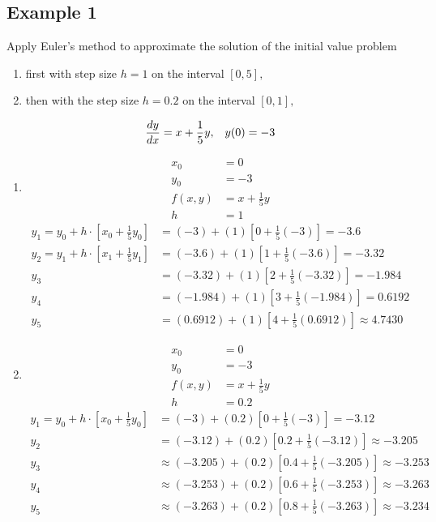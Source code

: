 \documentclass{article}
\begin{document}
\subsection{Example 1} \label{example:1}
Apply Euler's method to approximate the solution of the initial value problem
\begin{enumerate}[label=\textbf{(\alph*)}]
	\item first with step size $ h = 1 $ on the interval $ [0,5], $
	\item then with the step size $ h = 0.2 $ on the interval $ [0,1], $
\end{enumerate}
\begin{equation*}
	\cond{\frac{dy}{dx} = x + \frac{1}{5}y,}{y(0) = -3}
\end{equation*}
\begin{enumerate}[label=\textbf{(\alph*)}]
	\item
		\begin{align*}
			x_0 & = 0 \\
			y_0 & = -3 \\
			f(x,y) & = x + \frac{1}{5}y \\
			h & = 1
		\end{align*}
		\begin{align*}
			y_1 = y_0 + h \cdot \left[ x_0 + \frac{1}{5}y_0 \right] & = (-3) + (1) \left[ 0 + \frac{1}{5}(-3) \right] = -3.6 \\
			y_2 = y_1 + h \cdot \left[ x_1 + \frac{1}{5}y_1 \right] & = (-3.6) + (1) \left[ 1 + \frac{1}{5}(-3.6) \right] = -3.32 \\
			y_3 & = (-3.32) + (1) \left[ 2 + \frac{1}{5}(-3.32) \right] = -1.984 \\
			y_4 & = (-1.984) + (1) \left[ 3 + \frac{1}{5}(-1.984) \right] = 0.6192 \\
			y_5 & = (0.6912) + (1) \left[ 4 + \frac{1}{5}(0.6912) \right] \approx 4.7430
		\end{align*}
	\item
		\begin{align*}
			x_0 & = 0 \\
			y_0 & = -3 \\
			f(x,y) & = x + \frac{1}{5}y \\
			h & = 0.2
		\end{align*}
		\begin{align*}
			y_1 = y_0 + h \cdot \left[ x_0 + \frac{1}{5}y_0 \right] & = (-3) + (0.2) \left[ 0 + \frac{1}{5}(-3) \right] = -3.12 \\
			y_2 & = (-3.12) + (0.2) \left[ 0.2 + \frac{1}{5}(-3.12) \right] \approx -3.205 \\
			y_3 & \approx (-3.205) + (0.2) \left[ 0.4 + \frac{1}{5}(-3.205) \right] \approx -3.253 \\
			y_4 & \approx (-3.253) + (0.2) \left[ 0.6 + \frac{1}{5}(-3.253) \right] \approx -3.263 \\
			y_5 & \approx (-3.263) + (0.2) \left[ 0.8 + \frac{1}{5}(-3.263) \right] \approx -3.234
		\end{align*}
\end{enumerate}
\end{document}
